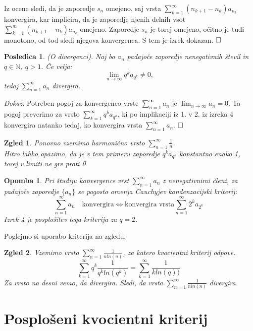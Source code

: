 \documentclass[a4paper,12pt]{article}
\def\qed{$\hfill\Box$}   %
\newtheorem{posledica}{Posledica}
\newtheorem{opomba}{Opomba}
\newtheorem{zgled}{Zgled}
\begin{document}
Iz ocene sledi, da je zaporedje ${s_n}$ omejeno, saj vrsta $\sum_{k = 1}^{\infty}{(n_{k+1} - n_k)a_{n_k}}$ konvergira, 
kar implicira, da je zaporedje njenih delnih vsot $\sum_{k = 1}^{m}{(n_{k+1} - n_k)a_{n_k}}$ omejeno.
Zaporedje ${s_n}$ je torej omejeno, očitno je tudi monotono, od tod sledi njegova konvergenca.
S tem je izrek dokazan.
\qed

\begin{posledica}(O divergenci).
    Naj bo $a_n$ padajoče zaporedje nenegativnih števil in $ q \in {\mathbb{N}}$, $q > 1$. Če velja:
    \[
        \lim_{n \to \infty}{q^ka_{q^k}} \neq 0 \text{,} 
    \]
    tedaj $\sum_{n = 1}^{\infty}{a_n}$ divergira.
\end{posledica}

\noindent
{\em Dokaz:\/}
Potreben pogoj za konvergenco vrste $\sum_{n = 1}^{\infty}{a_n}$ je
$\lim_{n \to \infty}{a_n} = 0$. Ta pogoj preverimo za vrsto $\sum_{k = 1}^{\infty}{q^ka_{q^k}}$,
ki po implikaciji iz 1. v 2. iz izreka 4 konvergira natanko tedaj, ko konvergira vrsta $\sum_{n = 1}^{\infty}{a_n}$.
\qed

\begin{zgled}
    Ponovno vzemimo harmonično vrsto $\sum_{n = 1}^{\infty}{\frac{1}{n}}$. \\
    Hitro lahko opazimo, da je v tem primeru zaporedje $q^ka_{q^k}$ konstantno enako 1, torej v limiti ne gre proti 0.
\end{zgled}


\begin{opomba}
    Pri študiju konvergence vrst $\sum_{n = 1}^{\infty}{a_n}$ z nenegativnimi členi, 
    za padajoče zaporedje $\{a_n\}$ se pogosto omenja \emph{Cauchyjev kondenzacijski kriterij}:
    \[
        \sum_{n = 1}^{\infty}{a_n} \quad \text{konvergira} \iff \text{konvergira vrsta}
        \sum_{n = 1}^{\infty}{2^ka_{2^k}}
    \]
    Izrek 4 je posplošitev tega kriterija za $q = 2$.
\end{opomba}

\noindent
Poglejmo si uporabo kriterija na zgledu.
\begin{zgled}
    Vzemimo vrsto $\sum_{n = 1}^{\infty}{\frac{1}{nln(n)}}$, za katero kvocientni kriterij odpove.
    \[
        \sum_{k = 1}^{\infty}{q^k\frac{1}{q^kln(q^k)}} =
        \sum_{k = 1}^{\infty}{\frac{1}{kln(q))}}
    \]
    Za vrsto na desni vemo, da divergira. Sledi, da vrsta $\sum_{n = 1}^{\infty}{\frac{1}{nln(n)}}$ divergira.
\end{zgled}


\section{Posplošeni kvocientni kriterij}
\end{document}
